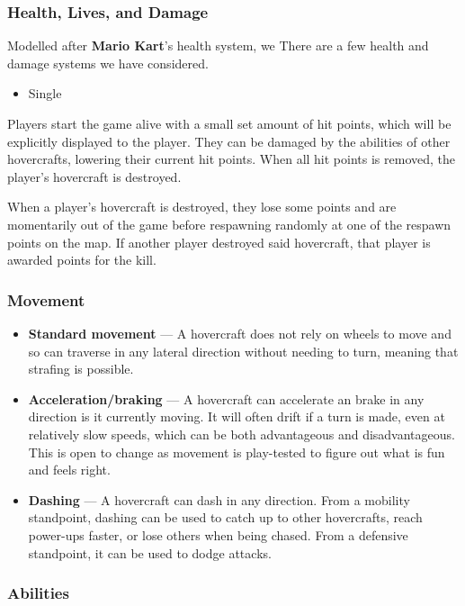 \documentclass{article}
\theoremstyle{definition}
\begin{document}
\subsubsection{Health, Lives, and Damage}

Modelled after \textbf{Mario Kart}'s health system, we 
There are a few health and damage systems we have considered.
\begin{itemize}
  \item Single
\end{itemize}
Players start the game alive with a small set amount of hit points, which will
be explicitly displayed to the player. They can be damaged by the abilities of
other hovercrafts, lowering their current hit points. When all hit points is
removed, the player's hovercraft is destroyed.

When a player's hovercraft is destroyed, they lose some points and are
momentarily out of the game before respawning randomly at one of the respawn
points on the map. If another player destroyed said hovercraft, that player is
awarded points for the kill.

\subsubsection{Movement}

\begin{itemize}
  \item \textbf{Standard movement} --- A hovercraft does not rely on wheels to
    move and so can traverse in any lateral direction without needing to turn,
    meaning that strafing is possible.
  \item \textbf{Acceleration/braking} --- A hovercraft can accelerate an brake
    in any direction is it currently moving. It will often drift if a turn is
    made, even at relatively slow speeds, which can be both advantageous and
    disadvantageous. This is open to change as movement is play-tested to
    figure out what is fun and feels right.
  \item \textbf{Dashing} --- A hovercraft can dash in any direction. From
    a mobility standpoint, dashing can be used to catch up to other
    hovercrafts, reach power-ups faster, or lose others when being chased. From
    a defensive standpoint, it can be used to dodge attacks.
\end{itemize}

\subsubsection{Abilities}
\end{document}
